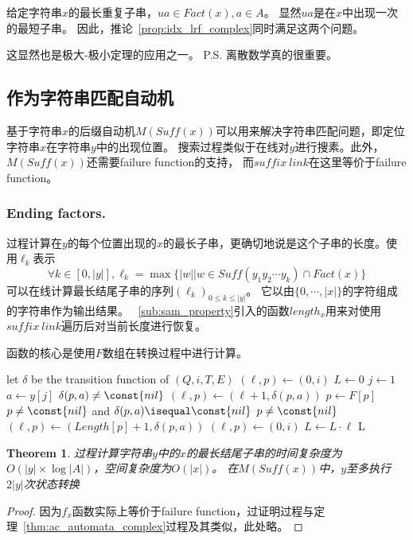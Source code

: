 \documentclass[UTF8]{ctexart}
\newtheorem{thm}{Theorem}[subsection]
\theoremstyle{definition}
\theoremstyle{remark}
\numberwithin{equation}{subsection}
\newcommand{\Suff}{\textit{Suff}}
\begin{document}
	给定字符串$x$的最长重复子串，$ua \in Fact(x), a \in A$。
	显然$ua$是在$x$中出现一次的最短子串。
	因此，推论~\ref{prop:idx_lrf_complex}同时满足这两个问题。
	
	这显然也是极大-极小定理的应用之一。
	P.S. 离散数学真的很重要。
	
\subsection{作为字符串匹配自动机}
\label{sub:as_strmatch_automata}
	
	基于字符串$x$的后缀自动机$M(\Suff(x))$可以用来解决字符串匹配问题，即定位字符串$x$在字符串$y$中的出现位置。
	搜索过程类似于在线对$y$进行搜素。此外，$M(\Suff(x))$还需要failure function的支持，
	而$suffix\ link$在这里等价于failure function。
	
\subsubsection{Ending factors.}
\label{subsub:strmacth_end_factor}

	过程计算在$y$的每个位置出现的$x$的最长子串，更确切地说是这个子串的长度。使用$\ell_k$表示
	\[
		\forall k \in [0, |y|], \ell_k = \max \{ |w| | w \in \Suff(y_1 y_2 \cdots y_k) \cap Fact(x) \}
	\]
	可以在线计算最长结尾子串的序列$(\ell_k)_{0 \le k \le |y|}$。
	它以由$\{0, \cdots, |x|\}$的字符组成的字符串作为输出结果。
	~\ref{sub:sam_property}引入的函数$length_x$用来对使用$suffix\ link$遍历后对当前长度进行恢复。
	
	函数的核心是使用$F$数组在转换过程中进行计算。
	\begin{codebox}
		\zi \Comment let $\delta$ be the transition function of $(Q, i, T, E)$
		\li	$(\ell, p) \gets (0, i)$
		\li	$L \gets 0$
		\li	\For $j \gets 1$ \To {}
		\li		\Do
					$a \gets y[j]$
		\li			\If $\delta(p,a) \neq \const{nil}$
		\li				\Then $(\ell, p) \gets (\ell+1, \delta(p,a))$
		\li			\Else 
		\li					\Do $p \gets F[p]$
							\End
		\li				\While $p \neq \const{nil}$ and $\delta(p,a) \isequal \const{nil}$
		\li				\If $p \neq \const{nil}$
		\li					\Then $(\ell, p) \gets (Length[p]+1, \delta(p,a))$
		\li				\Else
							$(\ell, p) \gets (0, i)$
							\End
						\End
		\li			$L \gets L \cdot \ell$			
				\End	
		\li	\Return L
	\end{codebox}
	
	\begin{thm}
		过程计算字符串$y$中的$x$的最长结尾子串的时间复杂度为$O(|y| \times \log |A|)$，空间复杂度为$O(|x|)$。
		在$M(\Suff(x))$中，$y$至多执行$2|y|$次状态转换
	\end{thm}
	\begin{proof}
		因为$f_x$函数实际上等价于failure function，过证明过程与定理~\ref{thm:ac_automata_complex}过程及其类似，此处略。
	\end{proof}
	
\end{document}
